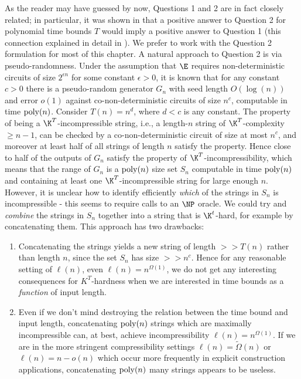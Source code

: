 As the reader may have guessed by now, Questions 1 and 2 are in fact closely related; in particular, it was shown in \cite{RSW} that a positive answer to Question 2 for polynomial time bounds $T$ would imply a positive answer to Question 1 (this connection explained in detail in ). We prefer to work with the Question 2 formulation for most of this chapter. A natural approach to Question 2 is via pseudo-randomness. Under the assumption that $\E$ requires non-deterministic circuits of size $2^{\epsilon n}$ for some constant $\epsilon > 0$, it is known \cite{IW97, KvM99} that for any constant $c > 0$ there is a pseudo-random generator $G_n$ with seed length $O(\log(n))$ and error $o(1)$ against co-non-deterministic circuits of size $n^c$, computable in time $\mathrm{poly}(n)$. Consider $T(n) = n^d$, where $d < c$ is any constant. The property of being a $\K^T$-incompressible string, i.e., a length-$n$ string of $\K^T$-complexity $\geq n-1$, can be checked by a co-non-deterministic circuit of size at most $n^c$, and moreover at least half of all strings of length $n$ satisfy the property. Hence close to half of the outputs of $G_n$ satisfy the property of $\K^T$-incompressibility, which means that the range of $G_n$ is a $\mathrm{poly}(n)$ size set $S_n$ computable in time $\mathrm{poly}(n)$ and containing at least one $\K^T$-incompressible string for large enough $n$. However, it is unclear how to identify efficiently {\it which} of the strings in $S_n$ is incompressible - this seems to require calls to an $\NP$ oracle. We could try and {\it combine} the strings in $S_n$ together into a string that is $\K^t$-hard, for example by concatenating them. This approach has two drawbacks:
\begin{enumerate}
    \item  Concatenating the strings yields a new string of length $>> T(n)$ rather than length $n$, since the set $S_n$ has size $>> n^c$. Hence for any reasonable setting of $\ell(n)$, even $\ell(n) = n^{\Omega(1)}$, we do not get any interesting consequences for $K^T$-hardness when we are interested in time bounds as a {\it function} of input length.
    \item Even if we don't mind destroying the relation between the time bound and input length, concatenating $\mathrm{poly}(n)$ strings which are maximally incompressible can, at best, achieve incompressibility $\ell(n) = n^{\Omega(1)}$. If we are in the more stringent compressibility settings $\ell(n) = \tilde{\Omega}(n)$ or $\ell(n) = n - o(n)$ which occur more frequently in explicit construction applications, concatenating $\mathrm{poly}(n)$ many strings appears to be useless.
\end{enumerate}

